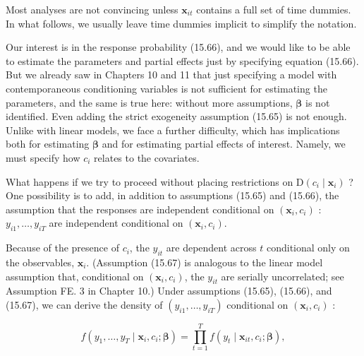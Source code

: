 \documentclass[10pt]{article}
\begin{document}
Most analyses are not convincing unless $\mathbf{x}_{i t}$ contains a full set of time dummies. In what follows, we usually leave time dummies implicit to simplify the notation.

Our interest is in the response probability (15.66), and we would like to be able to estimate the parameters and partial effects just by specifying equation (15.66). But we already saw in Chapters 10 and 11 that just specifying a model with contemporaneous conditioning variables is not sufficient for estimating the parameters, and the same is true here: without more assumptions, $\boldsymbol{\beta}$ is not identified. Even adding the strict exogeneity assumption (15.65) is not enough. Unlike with linear models, we face a further difficulty, which has implications both for estimating $\boldsymbol{\beta}$ and for estimating partial effects of interest. Namely, we must specify how $c_{i}$ relates to the covariates.

What happens if we try to proceed without placing restrictions on $\mathrm{D}\left(c_{i} \mid \mathbf{x}_{i}\right)$ ? One possibility is to add, in addition to assumptions (15.65) and (15.66), the assumption that the responses are independent conditional on $\left(\mathbf{x}_{i}, c_{i}\right)$ :\\
$y_{i 1}, \ldots, y_{i T}$ are independent conditional on $\left(\mathbf{x}_{i}, c_{i}\right)$.

Because of the presence of $c_{i}$, the $y_{i t}$ are dependent across $t$ conditional only on the observables, $\mathbf{x}_{i}$. (Assumption (15.67) is analogous to the linear model assumption that, conditional on $\left(\mathbf{x}_{i}, c_{i}\right)$, the $y_{i t}$ are serially uncorrelated; see Assumption FE. 3 in Chapter 10.) Under assumptions (15.65), (15.66), and (15.67), we can derive the density of $\left(y_{i 1}, \ldots, y_{i T}\right)$ conditional on $\left(\mathbf{x}_{i}, c_{i}\right)$ :


\begin{equation*}
f\left(y_{1}, \ldots, y_{T} \mid \mathbf{x}_{i}, c_{i} ; \boldsymbol{\beta}\right)=\prod_{t=1}^{T} f\left(y_{t} \mid \mathbf{x}_{i t}, c_{i} ; \boldsymbol{\beta}\right), \tag{15.68}
\end{equation*}
\end{document}
